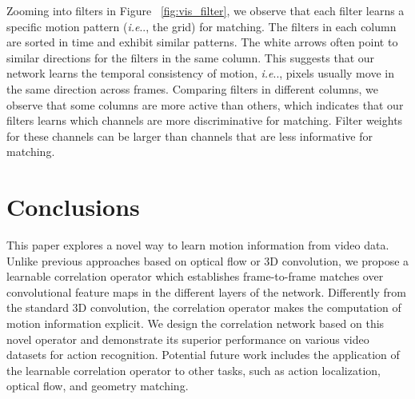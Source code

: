 \documentclass[10pt,twocolumn,letterpaper]{article}
\makeatletter
\DeclareRobustCommand\onedot{\futurelet\@let@token\@onedot}
\def\@onedot{\ifx\@let@token.\else.\null\fi\xspace}
\def\ie{\emph{i.e}\onedot} \def\Ie{\emph{I.e}\onedot}
\makeatother
\begin{document}
Zooming into filters in Figure ~\ref{fig:vis_filter}, we observe that each filter learns a specific motion pattern (\ie, the  grid) for matching. The filters in each column are sorted in time and exhibit similar patterns. The white arrows often point to similar directions for the filters in the same column. This suggests that our network learns the temporal consistency of motion, \ie, pixels usually move in the same direction across frames. Comparing filters in different columns, we observe that some columns are more active than others, which indicates that our filters learns which channels are more discriminative for matching. Filter weights for these channels can be larger than channels that are less informative for matching. \section{Conclusions}\label{sec:conclusion}

This paper explores a novel way to learn motion information from video data. Unlike previous approaches based on optical flow or 3D convolution, we propose a learnable correlation operator which establishes frame-to-frame matches over convolutional feature maps in the different layers of the network. Differently from the standard 3D convolution, the correlation operator makes the computation of motion information explicit. We design the correlation network based on this novel operator and demonstrate its superior performance on various video datasets for action recognition. Potential future work includes the application of the learnable correlation operator to other tasks, such as action localization, optical flow, and geometry matching.
 
{\small


}
\end{document}
